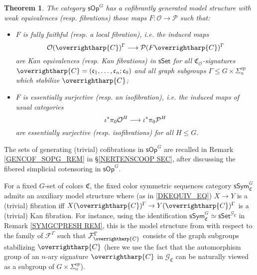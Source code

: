 \documentclass[a4paper,10pt
,draft
]{article}%
\numberwithin{equation}{section}
\numberwithin{figure}{section}
\newtheorem{theorem}[equation]{Theorem}%
\theoremstyle{definition} %
\newcommand{\longto}{\longrightarrow}%
\newcommand{\vect}[1]{\text{\overrightharp{\ensuremath{#1}}}}
\newcommand{\sSet}{\ensuremath{\mathsf{sSet}}}%
\newcommand{\sOp}{\ensuremath{\mathsf{sOp}}}%
\renewcommand{\O}{\ensuremath{\mathcal O}}
\renewcommand{\P}{\ensuremath{\mathcal P}}
\newcommand{\1}{\ensuremath{\mathbbm 1}}%
\begin{document}
\begin{theorem}\label{SOPG_THM}
      The category $\sOp^G$ has a cofibrantly generated model structure with weak equivalences (resp. fibrations) those maps
      $F \colon \O \to \P$ such that:
\begin{itemize}
\item $F$ is \emph{fully faithful} (resp. a \emph{local fibration}), i.e. the induced maps
	\begin{equation}\label{DKEQUIV_EQ}
		\O ( \vect{C})^\Gamma \longto 
		\P(F \vect{C})^\Gamma
	\end{equation}
	are Kan equivalences (resp. Kan fibrations) in $\sSet$
	for all $\mathfrak C_\O$-signatures $\vect C = (\mathfrak c_1, \dots, \mathfrak c_n; \mathfrak c_0)$
	and all graph subgroups $\Gamma \leq G \times \Sigma_n^{op}$ which stabilize $\vect C$;
\item $F$ is \emph{essentially surjective} (resp. an \emph{isofibration}), i.e. the induced maps of usual categories
	\begin{equation}\label{ESSSURJ EQ}
		\iota^{\**}\pi_0 \O^H \longto \iota^{\**}\pi_0 \P^H
	\end{equation}
	are essentially surjective (resp. isofibrations) for all $H \leq G$.
\end{itemize}
\end{theorem}

The sets of generating (trivial) cofibrations in $\sOp^G$
are recalled in Remark \ref{GENCOF_SOPG_REM} in \S \ref{NERTENSCOOP SEC},
after discussing the fibered simplicial cotensoring 
in $\sOp^G$.

	For a fixed $G$-set of colors $\mathfrak{C}$,
	the 
	fixed color symmetric sequences
	category
	$\mathsf{sSym}_{\mathfrak{C}}^G$
	admits an auxiliary model structure where
	(as in \eqref{DKEQUIV_EQ})
	$X \to Y$ is a (trivial) fibration
	iff 
	$X(\vect{C})^{\Gamma} \to Y(\vect{C})^{\Gamma}$
	is a (trivial) Kan fibration.
	For instance, using the identification
	$\mathsf{sSym}^{G}_{\mathfrak{C}}
	\simeq \mathsf{sSet}^{\mathcal{G}_{\mathfrak{C}}}$
	in Remark \ref{SYMGCPRESH REM},
	this is the model structure
	from \cite[Prop. \ref{OC-ALLEQ PROP}]{BP_FCOP}
	with respect to the family of 
	$\mathcal{F}^{\Gamma}$
	such that
	$\mathcal{F}^{\Gamma}_{\vect{C}}$
	consists of the graph subgroups stabilizing $\vect{C}$
	(here we use the fact that the automorphism group of 
	an $n$-ary signature $\vect{C}$ in 
	$\mathcal{G}_{\mathfrak{C}}$
	can be naturally viewed as a subgroup of 
	$G \times \Sigma_n^{op}$).
\end{document}
